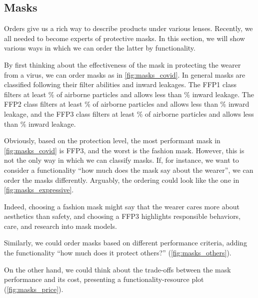 \vfill\clearpage
\subsection{Masks}

Orders give us a rich way to describe products under various lenses.
Recently, we all needed to become experts of protective masks.
In this section, we will show various ways in which we can order the latter by functionality.

\begin{marginfigure}
    \centering
    \caption{Ordering masks by protection levels}
    \label{fig:masks_covid}
\end{marginfigure}
By first thinking about the effectiveness of the mask in protecting the wearer from a virus, we can order masks as in \cref{fig:masks_covid}.
In general masks are classified following their filter abilities and inward leakages.
The FFP1 class filters at least \unit[80]{\%} of airborne particles and allows less than \unit[22]{\%} inward leakage.
The FFP2 class filters at least \unit[94]{\%} of airborne particles and allows less than \unit[8]{\%} inward leakage, and the FFP3 class filters at least \unit[99]{\%} of airborne particles and allows less than \unit[2]{\%} inward leakage.

Obviously, based on the protection level, the most performant mask in \cref{fig:masks_covid} is FFP3, and the worst is the fashion mask.
However, this is not the only way in which we can classify masks.
If, for instance, we want to consider a functionality ``how much does the mask say about the wearer'', we can order the masks differently.
Arguably, the ordering could look like the one in \cref{fig:masks_expressive}.

Indeed, choosing a fashion mask might say that the wearer cares more about aesthetics than safety, and choosing a FFP3 highlights responsible behaviors, care, and research into mask models.

Similarly, we could order masks based on different performance criteria, adding the functionality ``how much does it protect others?'' (\cref{fig:masks_others}).


On the other hand, we could think about the trade-offs between the mask performance and its cost, presenting a functionality-resource plot (\cref{fig:masks_price}).

